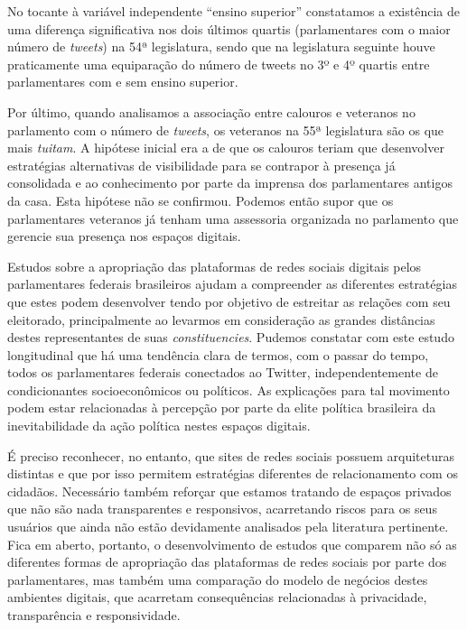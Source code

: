 No tocante à variável independente ``ensino superior'' constatamos a
existência de uma diferença significativa nos dois últimos quartis
(parlamentares com o maior número de \emph{tweets}) na 54ª legislatura,
sendo que na legislatura seguinte houve praticamente uma equiparação do
número de tweets no 3º e 4º quartis entre parlamentares com e sem ensino
superior.

Por último, quando analisamos a associação entre calouros e veteranos no
parlamento com o número de \emph{tweets}, os veteranos na 55ª
legislatura são os que mais \emph{tuitam}. A hipótese inicial era a de
que os calouros teriam que desenvolver estratégias alternativas de
visibilidade para se contrapor à presença já consolidada e ao
conhecimento por parte da imprensa dos parlamentares antigos da casa.
Esta hipótese não se confirmou. Podemos então supor que os parlamentares
veteranos já tenham uma assessoria organizada no parlamento que gerencie
sua presença nos espaços digitais.

Estudos sobre a apropriação das plataformas de redes sociais digitais
pelos parlamentares federais brasileiros ajudam a compreender as
diferentes estratégias que estes podem desenvolver tendo por objetivo de
estreitar as relações com seu eleitorado, principalmente ao levarmos em
consideração as grandes distâncias destes representantes de suas
\emph{constituencies}. Pudemos constatar com este estudo longitudinal
que há uma tendência clara de termos, com o passar do tempo, todos os
parlamentares federais conectados ao Twitter, independentemente de
condicionantes socioeconômicos ou políticos. As explicações para tal
movimento podem estar relacionadas à percepção por parte da elite
política brasileira da inevitabilidade da ação política nestes espaços
digitais.

É preciso reconhecer, no entanto, que sites de redes sociais possuem
arquiteturas distintas e que por isso permitem estratégias diferentes de
relacionamento com os cidadãos. Necessário também reforçar que estamos
tratando de espaços privados que não são nada transparentes e
responsivos, acarretando riscos para os seus usuários que ainda não
estão devidamente analisados pela literatura pertinente. Fica em aberto,
portanto, o desenvolvimento de estudos que comparem não só as diferentes
formas de apropriação das plataformas de redes sociais por parte dos
parlamentares, mas também uma comparação do modelo de negócios destes
ambientes digitais, que acarretam consequências relacionadas à
privacidade, transparência e responsividade.


